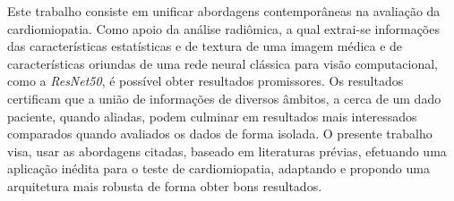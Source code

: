\begin{resumo}
Este trabalho consiste em unificar abordagens contemporâneas na avaliação da cardiomiopatia. Como apoio da análise radiômica, a qual extrai-se informações das características estatísticas e de textura de uma imagem médica e de características oriundas de uma rede neural clássica para visão computacional, como a \textit{ResNet50}, é possível obter resultados promissores. Os resultados certificam que a união de informações de diversos âmbitos, a cerca de um dado paciente, quando aliadas, podem culminar em resultados mais interessados comparados quando avaliados os dados de forma isolada. O presente trabalho visa, usar as abordagens citadas, baseado em literaturas prévias, efetuando uma aplicação inédita para o teste de cardiomiopatia, adaptando e propondo uma arquitetura mais robusta de forma obter bons resultados.

 
\end{resumo}